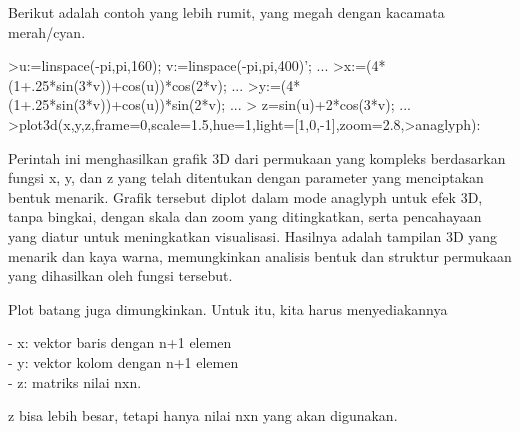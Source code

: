\documentclass{article}
\begin{document}
\begin{eulernotebook}
\begin{eulercomment}
\begin{eulercomment}
\begin{eulercomment}
\begin{eulercomment}
\begin{eulercomment}
\begin{eulercomment}
\begin{eulercomment}
Berikut adalah contoh yang lebih rumit, yang megah dengan kacamata
merah/cyan.
\end{eulercomment}
\begin{eulerprompt}
>u:=linspace(-pi,pi,160); v:=linspace(-pi,pi,400)';  ...
>x:=(4*(1+.25*sin(3*v))+cos(u))*cos(2*v); ...
>y:=(4*(1+.25*sin(3*v))+cos(u))*sin(2*v); ...
> z=sin(u)+2*cos(3*v); ...
>plot3d(x,y,z,frame=0,scale=1.5,hue=1,light=[1,0,-1],zoom=2.8,>anaglyph):
\end{eulerprompt}
\begin{eulercomment}
Perintah ini menghasilkan grafik 3D dari permukaan yang kompleks
berdasarkan fungsi x, y, dan z yang telah ditentukan dengan parameter
yang menciptakan bentuk menarik. Grafik tersebut diplot dalam mode
anaglyph untuk efek 3D, tanpa bingkai, dengan skala dan zoom yang
ditingkatkan, serta pencahayaan yang diatur untuk meningkatkan
visualisasi. Hasilnya adalah tampilan 3D yang menarik dan kaya warna,
memungkinkan analisis bentuk dan struktur permukaan yang dihasilkan
oleh fungsi tersebut.

\begin{eulercomment}
\begin{eulercomment}
Plot batang juga dimungkinkan. Untuk itu, kita harus menyediakannya

- x: vektor baris dengan n+1 elemen\\
- y: vektor kolom dengan n+1 elemen\\
- z: matriks nilai nxn.

z bisa lebih besar, tetapi hanya nilai nxn yang akan digunakan.


\end{eulercomment}
\end{eulercomment}
\end{eulercomment}
\end{eulercomment}
\end{eulercomment}
\end{eulercomment}
\end{eulercomment}
\end{eulercomment}
\end{eulercomment}
\end{eulernotebook}
\end{document}
